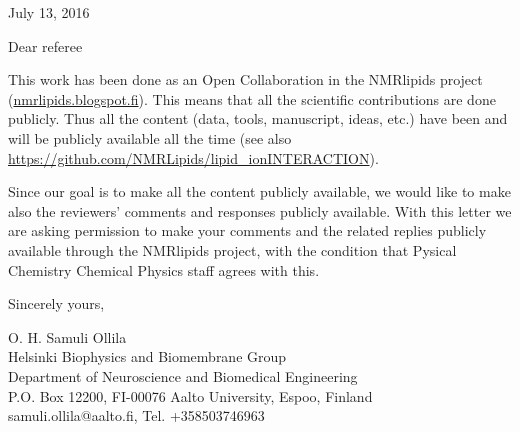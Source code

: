 \documentclass[14pt]{extletter}
\begin{document}
\reversemarginpar
\pagestyle{empty}

July 13, 2016

Dear referee

This work has been done as an Open Collaboration in the NMRlipids project (\url{nmrlipids.blogspot.fi}). This means that all the scientific contributions are done publicly. Thus all the content (data, tools, manuscript, ideas, etc.) have been and will be publicly available all the time (see also \url{https://github.com/NMRLipids/lipid_ionINTERACTION}).

Since our goal is to make all the content publicly available, we would like to make also the reviewers' comments and responses publicly available. With this letter we are asking permission to make your comments and the related replies publicly available through the NMRlipids project, with the condition that Pysical Chemistry Chemical Physics staff agrees with this. 


Sincerely yours, %

\noindent O. H. Samuli Ollila \\
\noindent Helsinki Biophysics and Biomembrane Group\\
\noindent Department of Neuroscience and Biomedical Engineering\\
\noindent P.O. Box 12200, FI-00076 Aalto University, Espoo, Finland\\
\noindent samuli.ollila@aalto.fi, Tel. +358503746963 \\
\end{document}
